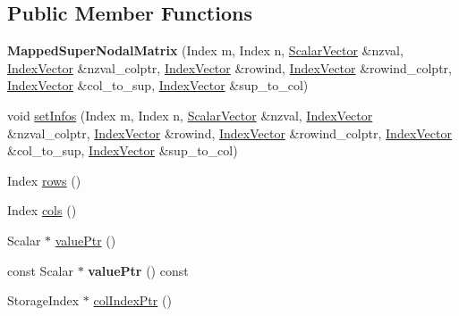 \subsection*{Public Member Functions}
\begin{DoxyCompactItemize}
\item 
\mbox{\label{class_eigen_1_1internal_1_1_mapped_super_nodal_matrix_a3bd8587a1c75dc90e5403322ee85bd7f}} 
{\bfseries Mapped\+Super\+Nodal\+Matrix} (Index m, Index n, \mbox{\hyperlink{class_eigen_1_1_matrix}{Scalar\+Vector}} \&nzval, \mbox{\hyperlink{class_eigen_1_1_matrix}{Index\+Vector}} \&nzval\+\_\+colptr, \mbox{\hyperlink{class_eigen_1_1_matrix}{Index\+Vector}} \&rowind, \mbox{\hyperlink{class_eigen_1_1_matrix}{Index\+Vector}} \&rowind\+\_\+colptr, \mbox{\hyperlink{class_eigen_1_1_matrix}{Index\+Vector}} \&col\+\_\+to\+\_\+sup, \mbox{\hyperlink{class_eigen_1_1_matrix}{Index\+Vector}} \&sup\+\_\+to\+\_\+col)
\item 
void \mbox{\hyperlink{class_eigen_1_1internal_1_1_mapped_super_nodal_matrix_af1427486564e2c75b9da68f98bd04e63}{set\+Infos}} (Index m, Index n, \mbox{\hyperlink{class_eigen_1_1_matrix}{Scalar\+Vector}} \&nzval, \mbox{\hyperlink{class_eigen_1_1_matrix}{Index\+Vector}} \&nzval\+\_\+colptr, \mbox{\hyperlink{class_eigen_1_1_matrix}{Index\+Vector}} \&rowind, \mbox{\hyperlink{class_eigen_1_1_matrix}{Index\+Vector}} \&rowind\+\_\+colptr, \mbox{\hyperlink{class_eigen_1_1_matrix}{Index\+Vector}} \&col\+\_\+to\+\_\+sup, \mbox{\hyperlink{class_eigen_1_1_matrix}{Index\+Vector}} \&sup\+\_\+to\+\_\+col)
\item 
Index \mbox{\hyperlink{class_eigen_1_1internal_1_1_mapped_super_nodal_matrix_a5cc8f3887a09bd7d078a6744c158b5a0}{rows}} ()
\item 
Index \mbox{\hyperlink{class_eigen_1_1internal_1_1_mapped_super_nodal_matrix_a57b3811f03be2d94c0cdd105aba1b932}{cols}} ()
\item 
Scalar $\ast$ \mbox{\hyperlink{class_eigen_1_1internal_1_1_mapped_super_nodal_matrix_a6e9ce7d448b76811802d11baf3da97d3}{value\+Ptr}} ()
\item 
\mbox{\label{class_eigen_1_1internal_1_1_mapped_super_nodal_matrix_a3edbda057db71bc0ad442029cf2d0f2d}} 
const Scalar $\ast$ {\bfseries value\+Ptr} () const
\item 
Storage\+Index $\ast$ \mbox{\hyperlink{class_eigen_1_1internal_1_1_mapped_super_nodal_matrix_a87c0272aedd8ee01d4245bd719738b5d}{col\+Index\+Ptr}} ()

\end{DoxyCompactItemize}
